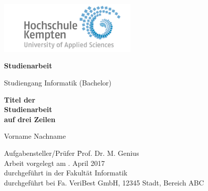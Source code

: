 \thispagestyle{empty}



\vspace*{-20mm}
\begin{flushright}
\includegraphics[width=0.5\textwidth]{Bilder/LogoHS.png}
\end{flushright}


\vspace*{2cm}

\begin{center}
{\Large \textbf{Studienarbeit}}\\ 

\vspace*{1cm}

{\large Studiengang Informatik (Bachelor)\\[1mm]}

\vspace{1cm}

{\Large \bfseries Titel der\\ 
	Studienarbeit\\
	auf drei Zeilen\\}


\vspace{1.5cm}

{\large Vorname Nachname}\\[40mm]

\end{center}

\vfill

\parbox{120mm}{
\begin{tabbing}
Aufgabensteller/Prüfer \hspace{.7cm} \= Prof. Dr. M. Genius\\
Arbeit vorgelegt am                  . April 2017\\
durchgeführt in der                  \> Fakultät Informatik\\[4mm]
durchgeführt bei                     \> Fa. VeriBest GmbH, 12345 Stadt, Bereich ABC\\
\end{tabbing}
}

